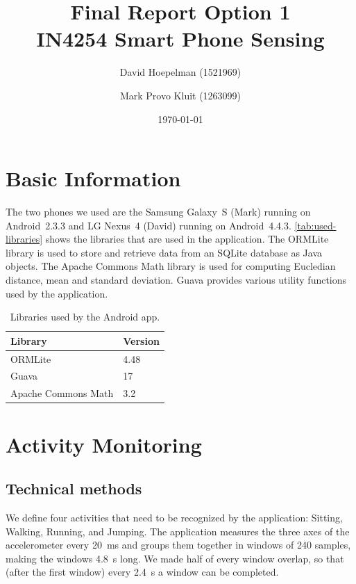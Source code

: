 \documentclass[a4paper,10pt,twoside]{IEEEtran}
\title{\huge{\textbf{Final Report Option 1}\\IN4254 Smart Phone Sensing}}
\date{\today}
\author{David Hoepelman (1521969) \and Mark Provo Kluit (1263099)}
\begin{document}
\maketitle

\newpage
{}


\newpage
{}

\section{Basic Information}
\label{sec:basic-information}
The two phones we used are the Samsung Galaxy~S (Mark) running on Android~2.3.3 and LG Nexus~4 (David) running on Android~4.4.3. \autoref{tab:used-libraries} shows the libraries that are used in the application. The ORMLite library is used to store and retrieve data from an SQLite database as Java objects. The Apache Commons Math library is used for computing Eucledian distance, mean and standard deviation. Guava provides various utility functions used by the application.

\begin{table}[ht]
\centering
\caption{Libraries used by the Android app.}
\begin{tabular}{ll}
\toprule
Library & Version\\
\midrule
ORMLite & 4.48\\
Guava & 17\\
Apache Commons Math & 3.2\\
\bottomrule
\end{tabular}
\label{tab:used-libraries}
\end{table}

\section{Activity Monitoring}
\label{sec:activity-monitoring}
\subsection{Technical methods}
We define four activities that need to be recognized by the application: Sitting, Walking, Running, and Jumping.
The application measures the three axes of the accelerometer every 20~ms and groups them together in windows of 240 samples, making the windows 4.8~s long.
We made half of every window overlap, so that (after the first window) every 2.4~s a window can be completed.
\end{document}
